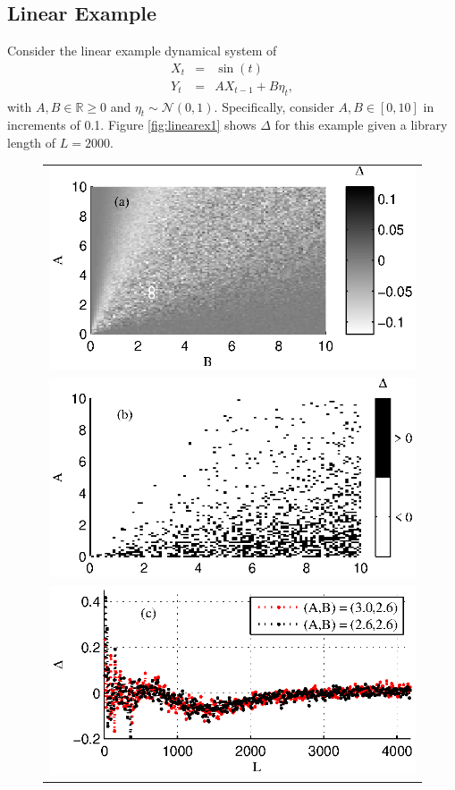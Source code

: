 \documentclass[twocolumn,aps,pre,groupedaddress]{revtex4-1}
\begin{document}
\subsection{Linear Example}
Consider the linear example dynamical system of
\begin{eqnarray}
\label{eq:linearex}
X_t &=& \sin(t)\\
Y_t &=& AX_{t-1}+B\eta_t,
\end{eqnarray}
with $A,B\in\mathbb{R}\ge 0$ and $\eta_t\sim\mathcal{N}\left(0,1\right)$.  Specifically, consider $A,B\in[0,10]$ in increments of 0.1.  Figure \ref{fig:linearex1} shows $\Delta$ for this example given a library length of $L=2000$.
\begin{figure}[ht]
\begin{tabular}{l}
\includegraphics[scale=0.8]{LinearEx.eps} \\
\includegraphics[scale=0.8]{LinearEx3Color.eps} \\
\includegraphics[scale=0.8]{LinearExChangeL.eps} \\

\end{tabular}
\end{figure}
\end{document}
